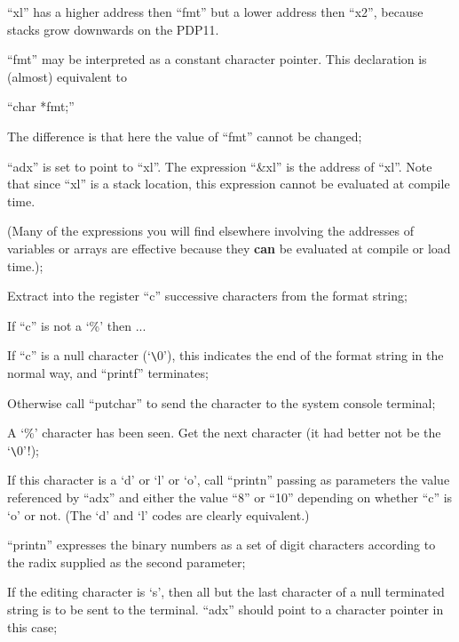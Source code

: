 ``xl'' has a higher address then ``fmt''
but a lower address then ``x2'', because
stacks grow downwards on the PDP11.

\bd
\item[2341:] ``fmt'' may be interpreted as a
 constant character pointer. This
 declaration is (almost)
 equivalent to

 ``char *fmt;''

The difference is that here the
value of ``fmt'' cannot be changed;

\item[2346:] ``adx'' is set to point to ``xl''.
 The expression ``\&xl'' is the
 address of ``xl''. Note that since
 ``xl'' is a stack location, this
 expression cannot be evaluated at
 compile time.

(Many of the expressions you will
find elsewhere involving the
addresses of variables or arrays
are effective because they {\bf can} be
evaluated at compile or load
time.);

\item[2348:] Extract into the register ``c''
 successive characters from the
 format string;

\item[2349:] If ``c'' is not a `\%' then ...

\item[2350:] If ``c'' is a null character
 (`\verb+\+0'), this indicates the end of
 the format string in the normal
 way, and ``printf'' terminates;

\item[2351:] Otherwise call ``putchar'' to send
 the character to the system console terminal;

\item[2353:] A `\%' character has been seen.
 Get the next character (it had
 better not be the `\verb+\+0'!);

\item[2354:] If this character is a `d' or `l'
 or `o', call ``printn'' passing as
 parameters the value referenced
 by ``adx'' and either the value ``8''
 or ``10'' depending on whether ``c''
 is `o' or not. (The `d' and `l'
 codes are clearly equivalent.)

``printn'' expresses the binary
numbers as a set of digit characters according to the radix 
supplied as the second parameter;

\item[2356:] If the editing character is `s',
 then all but the last character
 of a null terminated string is to
 be sent to the terminal. ``adx''
 should point to a character
 pointer in this case;

